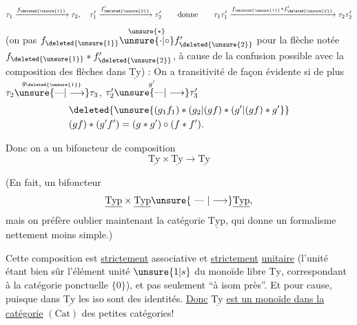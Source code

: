 

\[
\tau_1\xrightarrow{f_{\deleted{\unsure{1}}}}\tau_2,\quad
\tau'_1\xrightarrow{f'_{\deleted{\unsure{2}}}}\tau'_2
\qquad\text{donne}\qquad
\tau_1\tau'_1\xrightarrow{f_{\deleted{\unsure{1}}}*f'_{\deleted{\unsure{2}}}}\tau_2\tau'_2
\]
(on  pas $f_{\deleted{\unsure{1}}}\overset{\unsure{*}}{\unsure{\cdot|\circ}}f'_{\deleted{\unsure{2}}}$ pour la flèche notée $f_{\deleted{\unsure{1}}}*f'_{\deleted{\unsure{2}}}$, à cause de la confusion possible avec la composition des flèches dans $\underline{\mathrm{Ty}}$) : On a transitivité de façon évidente si de plus $\tau_2\overset{g_{\deleted{\unsure{1}}}}{\unsure{\text{---}|\longrightarrow}}\tau_3$, $\tau'_2\overset{g'}{\unsure{\text{---}|\longrightarrow}}\tau'_3$
\[
\begin{aligned}
&\deleted{\unsure{(g_1f_1)*(g_2|(gf)*(g'|(gf)*g'}}\\
&(gf)*(g'f')=(g*g')\circ(f*f').
\end{aligned}
\]

Donc on a un bifoncteur de composition
\[
\underline{\mathrm{Ty}}\times\underline{\mathrm{Ty}}\longrightarrow\underline{\mathrm{Ty}}
\]

(En fait,  un bifoncteur 
\[
\underline{\mathrm{Typ}}\times\underline{\mathrm{Typ}}\unsure{\text{ --- }|\longrightarrow}\underline{\mathrm{Typ}},
\]
mais on préfère oublier maintenant la catégorie $\underline{\mathrm{Typ}}$, qui donne un formalisme nettement moins simple.)

Cette composition est \uline{strictement} associative et \uline{strictement} \uline{unitaire} (l'unité étant bien sûr l'élément unité $\unsure{1|s}$ du monoïde libre $\mathrm{Ty}$, correspondant à la catégorie ponctuelle $\{0\}$), et pas seulement ``à isom près''. Et pour cause, puisque dans $\underline{\mathrm{Ty}}$ les  iso sont des identités. \uline{Donc} $\underline{\mathrm{Ty}}$ \uline{est un monoïde dans la catégorie} $(\mathrm{Cat})$ des petites catégories!
